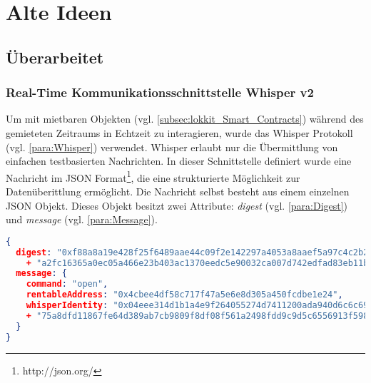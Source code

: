 \chapter{Alte Ideen}

\section{Überarbeitet}

\subsection{Real-Time Kommunikationsschnittstelle Whisper v2}
Um mit mietbaren Objekten (vgl. \ref{subsec:lokkit_Smart_Contracts}) während des gemieteten Zeitraums in Echtzeit zu interagieren, wurde das Whisper Protokoll (vgl. \ref{para:Whisper}) verwendet. Whisper erlaubt nur die Übermittlung von einfachen testbasierten Nachrichten. In dieser Schnittstelle definiert wurde eine Nachricht im JSON Format\footnote{http://json.org/}, die eine strukturierte Möglichkeit zur Datenüberittlung ermöglicht.
Die Nachricht selbst besteht aus einem einzelnen JSON Objekt. Dieses Objekt besitzt zwei Attribute: \emph{digest} (vgl. \ref{para:Digest}) und \emph{message} (vgl. \ref{para:Message}).

\begin{lstlisting}[language=json,caption={Beispiel einer Real-Time Nachricht via Whisper Protokoll}]
{
  digest: "0xf88a8a19e428f25f6489aae44c09f2e142297a4053a8aaef5a97c4c2b246c89477"
    + "a2fc16365a0ec05a466e23b403ac1370eedc5e90032ca007d742edfad83eb11b",
  message: {
    command: "open",
    rentableAddress: "0x4cbee4df58c717f47a5e6e8d305a450fcdbe1e24",
    whisperIdentity: "0x04eee314d1b1a4e9f264055274d7411200ada940d6c6c698d53bf40b41ff0f5277"
    + "75a8dfd11867fe64d389ab7cb9809f8df08f561a2498fdd9c9d5c6556913f598"
  }
}
\end{lstlisting}

